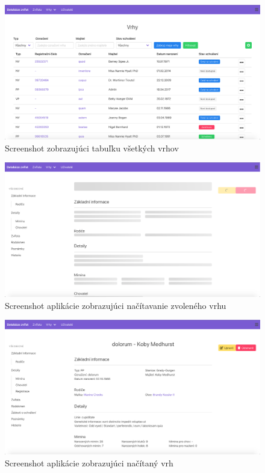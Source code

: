 \begin{figure}[H]
	\includegraphics[width=1.0\textwidth]{media/priloha/vrhy/1.png}
	\caption{Screenshot zobrazujúci tabuľku všetkých vrhov}
\end{figure}

\begin{figure}[H]
	\includegraphics[width=1.0\textwidth]{media/priloha/vrh/1.png}
	\caption{Screenshot aplikácie zobrazujúci načítavanie zvoleného vrhu}
\end{figure}

\begin{figure}[H]
	\includegraphics[width=1.0\textwidth]{media/priloha/vrh/2.png}
	\caption{Screenshot aplikácie zobrazujúci načítaný vrh}
\end{figure}

